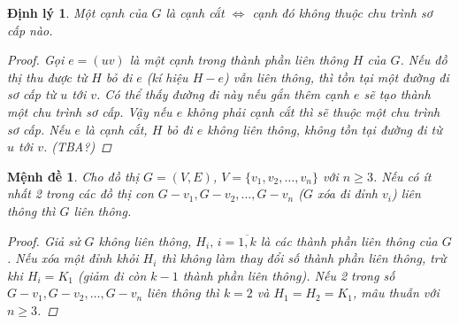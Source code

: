 \documentclass[14pt]{extarticle}
\newtheorem{theorem}{Định lý}[section]
\newtheorem{proposition}{Mệnh đề}[section]
\begin{document}
\begin{theorem}
Một cạnh của $G$ là cạnh cắt $\iff$ cạnh đó không thuộc chu trình sơ cấp nào.	
\begin{proof}
	Gọi $e=(uv)$ là một cạnh trong thành phần liên thông $H$ của $G$. Nếu đồ thị thu được từ $H$ bỏ đi $e$ (kí hiệu $H-e$) vẫn liên thông, thì tồn tại một đường đi sơ cấp từ $u$ tới $v$. Có thể thấy đường đi này nếu gắn thêm cạnh $e$ sẽ tạo thành một chu trình sơ cấp. Vậy nếu $e$ không phải cạnh cắt thì sẽ thuộc một chu trình sơ cấp. Nếu $e$ là cạnh cắt, $H$ bỏ đi $e$ không liên thông, không tồn tại đường đi từ $u$ tới $v$. (TBA?)
\end{proof}
\end{theorem}

\begin{proposition}
	Cho đồ thị $G = (V,E)$, $V=\{v_1, v_2,\ldots,v_n\}$ với $n \ge 3$. Nếu có ít nhất 2 trong các đồ thị con $G-v_1,G-v_2,\ldots,G-v_n$ ($G$ xóa đi đỉnh $v_i$) liên thông thì $G$ liên thông.
	\begin{proof}
		Giả sử $G$ không liên thông, $H_i,\, i = \overline{1,k}$ là các thành phần liên thông của $G$. Nếu xóa một đỉnh khỏi $H_i$ thì không làm thay đổi số thành phần liên thông, trừ khi $H_i = K_1$ (giảm đi còn $k-1$ thành phần liên thông). Nếu 2 trong số $G-v_1,G-v_2,\ldots,G-v_n$ liên thông thì $k = 2$ và $H_1 = H_2 = K_1$, mâu thuẫn với $n \ge 3$.
	\end{proof}
\end{proposition}
\end{document}
